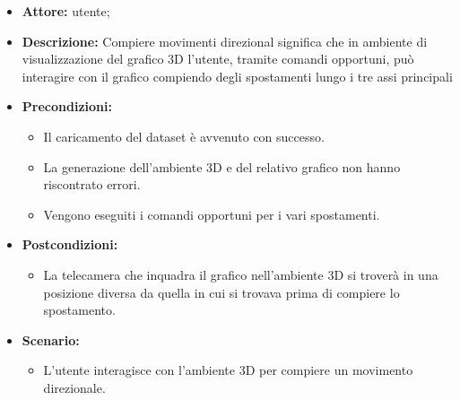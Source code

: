 \begin{itemize}    
    \item \textbf{Attore:} utente;
    \item \textbf{Descrizione:} Compiere movimenti direzional significa che in ambiente di visualizzazione del grafico 3D l'utente, 
    tramite comandi opportuni, può interagire con il grafico compiendo degli spostamenti lungo i tre assi principali
    \item \textbf{Precondizioni:}    
        \begin{itemize}
            \item Il caricamento del dataset è avvenuto con successo.
            \item La generazione dell'ambiente 3D e del relativo grafico non hanno riscontrato errori.
            \item Vengono eseguiti i comandi opportuni per i vari spostamenti.
        \end{itemize}    
    \item \textbf{Postcondizioni:}
        \begin{itemize}
            \item La telecamera che inquadra il grafico nell'ambiente 3D si troverà in una posizione diversa da quella in cui si trovava prima di compiere lo spostamento.
        \end{itemize}    
    \item \textbf{Scenario:} 
        \begin{itemize}
            \item L'utente interagisce con l'ambiente 3D per compiere un movimento direzionale.
        \end{itemize}
\end{itemize}
